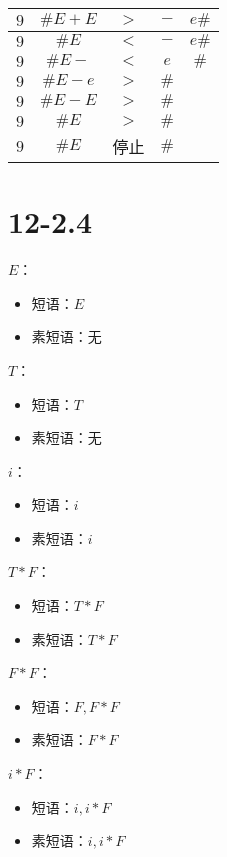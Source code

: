 \documentclass[UTF8]{ctexart}
\begin{document}
\begin{tabular}{|c|c|c|c|c|}
            \hline
            $9$ & $\#E+E$ & $>$ & $-$ & $e\#$ \\
            \hline
            $9$ & $\#E$ & $<$ & $-$ & $e\#$ \\
            \hline
            $9$ & $\#E-$ & $<$ & $e$ & $\#$ \\
            \hline
            $9$ & $\#E-e$ & $>$ & $\#$ & \\
            \hline
            $9$ & $\#E-E$ & $>$ & $\#$ & \\
            \hline
            $9$ & $\#E$ & $>$ & $\#$ & \\
            \hline
            $9$ & $\#E$ & 停止 & $\#$ & \\
            \hline
        \end{tabular}

\section*{12-2.4}

    $E$：
    \begin{itemize}
        \item 短语：$E$
        \item 素短语：无
    \end{itemize}

    $T$：
    \begin{itemize}
        \item 短语：$T$
        \item 素短语：无
    \end{itemize}
    
    $i$：
    \begin{itemize}
        \item 短语：$i$
        \item 素短语：$i$
    \end{itemize}
    
    $T*F$：
    \begin{itemize}
        \item 短语：$T*F$
        \item 素短语：$T*F$
    \end{itemize}
    
    $F*F$：
    \begin{itemize}
        \item 短语：$F, F*F$
        \item 素短语：$F * F$
    \end{itemize}
    
    $i*F$：
    \begin{itemize}
        \item 短语：$i, i*F$
        \item 素短语：$i, i*F$
    \end{itemize}
    
\end{document}
